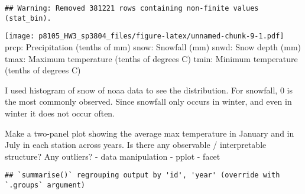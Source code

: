 \documentclass[]{article}
\newenvironment{Shaded}{\begin{snugshade}}{\end{snugshade}}
\newcommand{\DataTypeTok}[1]{\textcolor[rgb]{0.13,0.29,0.53}{#1}}
\newcommand{\DecValTok}[1]{\textcolor[rgb]{0.00,0.00,0.81}{#1}}
\newcommand{\KeywordTok}[1]{\textcolor[rgb]{0.13,0.29,0.53}{\textbf{#1}}}
\newcommand{\NormalTok}[1]{#1}
\newcommand{\OperatorTok}[1]{\textcolor[rgb]{0.81,0.36,0.00}{\textbf{#1}}}
\newcommand{\OtherTok}[1]{\textcolor[rgb]{0.56,0.35,0.01}{#1}}
\newcommand{\StringTok}[1]{\textcolor[rgb]{0.31,0.60,0.02}{#1}}
\begin{document}
\begin{verbatim}
## Warning: Removed 381221 rows containing non-finite values (stat_bin).
\end{verbatim}

\texttt{[image: p8105\_HW3\_sp3804\_files/figure-latex/unnamed-chunk-9-1.pdf]}
prcp: Precipitation (tenths of mm) snow: Snowfall (mm) snwd: Snow depth
(mm) tmax: Maximum temperature (tenths of degrees C) tmin: Minimum
temperature (tenths of degrees C)

I used histogram of snow of noaa data to see the distribution. For
snowfall, 0 is the most commonly observed. Since snowfall only occurs in
winter, and even in winter it does not occur often.

Make a two-panel plot showing the average max temperature in January and
in July in each station across years. Is there any observable /
interpretable structure? Any outliers? - data manipulation - pplot -
facet

\begin{Shaded}
\end{Shaded}

\begin{verbatim}
## `summarise()` regrouping output by 'id', 'year' (override with `.groups` argument)
\end{verbatim}
\end{document}
